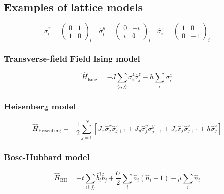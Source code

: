 \subsection{Examples of lattice models}
\label{subsec:latt-examples}

\begin{equation}
	\hat{\sigma}^x_{i}=\left(\begin{array}{cc}0 & 1 \\ 1 & 0\end{array}\right)_{i} \quad \hat{\sigma}^y_{i}=\left(\begin{array}{cc}0 & -i \\ i & 0\end{array}\right)_{i} \quad \hat{\sigma}^z_{i}=\left(\begin{array}{cc}1 & 0 \\ 0 & -1\end{array}\right)_{i}
\end{equation}


\subsubsection{Transverse-field Field Ising model}
\begin{equation}
	\hat H_{\mathrm{Ising}}=-J \sum_{\langle i, j\rangle} \hat{\sigma}^z_{i} \hat{\sigma}^z_{j}-h \sum_{i} \sigma^x_{i}
\end{equation}

\subsubsection{Heisenberg model}
\begin{equation}
	\hat{H}_{\mathrm{Heisenberg}}=-\frac{1}{2} \sum_{j=1}^{N}
	\left[J_{x} \hat{\sigma}_{j}^{x} \hat{\sigma}_{j+1}^{x}+J_{y} \hat{\sigma}_{j}^{y} \sigma_{j+1}^{y}+J_{z} \hat{\sigma}_{j}^{z} \hat{\sigma}_{j+1}^{z}+h \hat{\sigma}_{j}^{z}
	\right]
\end{equation}

\subsubsection{Bose-Hubbard model}
\begin{equation}
	\hat{H}_{\mathrm{BH}}= -t \sum_{\langle i, j\rangle} \hat{b}_{i}^{\dagger} \hat{b}_{j}+\frac{U}{2} \sum_{i} \hat{n}_{i}\left(\hat{n}_{i}-1\right)-\mu \sum_{i} \hat{n}_{i}
\end{equation}

